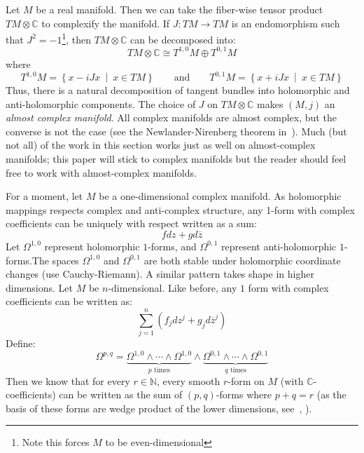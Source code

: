 \documentclass{book}
\newcommand{\N}{{\mathbb{N}}}
\newcommand{\C}{{\mathbb{C}}}
\newcommand{\set}[2]{\left\{#1 \ \middle|\ #2\right\}}
\begin{document}
Let $M$ be a real manifold. Then we can take the fiber-wise tensor product $TM\otimes \C$ to complexify the
manifold. If $J: TM \to TM$ is an endomorphism such that $J^2 = -1$\footnote{Note this forces $M$ to be
even-dimensional}, then $TM\otimes \C$ can be decomposed into:
\[
  TM\otimes \C \cong T^{1,0}M \oplus T^{0,1}M
\]
where
\[
  T^{1,0}M = \set{x-iJx}{x \in TM} \qquad \text{and} \qquad T^{0,1}M =\set{x+iJx}{x \in TM}
\]
Thus, there is a natural decomposition of tangent bundles into holomorphic and anti-holomorphic components.
The choice of $J$ on $TM\otimes \C$ makes $(M,j)$ an \emph{almost complex manifold}. All complex manifolds are
almost complex, but the converse is not the case (see the Newlander-Nirenberg theorem
in~\cite{HodgeTheory2014}). Much (but not all) of the work in this section works just as well on almost-complex
manifolds; this paper will stick to complex manifolds but the reader should feel free to work with
almost-complex manifolds.

For a moment, let $M$ be a one-dimensional complex manifold. As holomorphic mappings respects
complex and anti-complex structure, any 1-form with complex coefficients can be uniquely with respect written
as a sum:
\[
   fdz + gd\overline{z}
\]
Let $\Omega^{1,0}$ represent holomorphic $1$-forms, and $\Omega^{0,1}$ represent anti-holomorphic
$1$-forms.The spaces $\Omega^{1,0}$ and $\Omega^{0,1}$ are both stable under holomorphic coordinate
changes (use Cauchy-Riemann). A similar pattern takes shape in higher dimensions. Let $M$ be $n$-dimensional. Like before, any $1$ form with
complex coefficients can be written as:
\[
  \sum_{j=1}^n (f_jdz^{j} + g_jd\overline{z}^j)
\]
Define:
\[
  \Omega^{p,q} = \underbrace{\Omega^{1,0} \wedge \cdots \wedge \Omega^{1,0}}_{\text{$p$ times}}\wedge \underbrace{\Omega^{0,1} \wedge \cdots \wedge \Omega^{0,1}}_{\text{$q$ times}}
\]
Then we know that for every $r \in \N$, every smooth $r$-form on $M$ (with $\C$-coefficients) can be written
as the sum of $(p,q)$-forms where $p+q = r$ (as the basis of these forms are wedge product of the lower
dimensions, see~\cite{NateDiffGeo}, \cite{NateAlgTop}).
\end{document}
